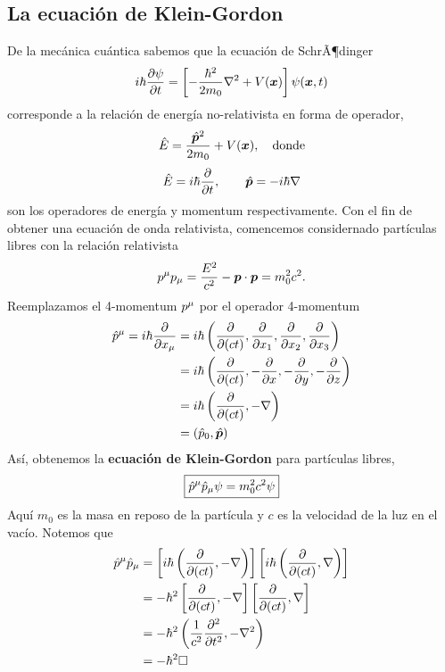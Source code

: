 \subsection{La ecuación de Klein-Gordon}
De la mecánica cuántica sabemos que la ecuación de SchrÃ¶dinger
\begin{equation}
  i\hbar \pdv{\psi}{t}=\left[-\frac{\hbar^2}{2m_0}\nabla^2+V(\vec{x})\right]\psi\xt 
\end{equation}
corresponde a la relación de energía no-relativista en forma de operador,
\begin{equation}
  \hat{E}=\frac{\hat{\vec{p}}^2}{2m_0}+V(\vec{x}),\quad \rm donde
\end{equation}
\begin{equation}
  \hat{E}=i\hbar\pdv{t},\qquad \hat{\vec{p}}=-i\hbar\nabla
\end{equation}
son los operadores de energía y momentum respectivamente. Con el fin de obtener una ecuación de onda relativista, comencemos considernado partículas libres con la relación relativista
\begin{equation}
  p^\m p_\m =\frac{E^2}{c^2}-\vec{p}\cdot\vec{p}=m_0^2c^2.
\end{equation}
Reemplazamos el 4-momentum $p^\m $ por el operador 4-momentum
\begin{align}
  \hat{p}^\m =i\hbar\pdv{x_\m }&=i\hbar\left(\pdv{(ct)},\pdv{x_1},\pdv{x_2},\pdv{x_3}\right)\\
  &=i\hbar\left(\pdv{(ct)},-\pdv{x},-\pdv{y},-\pdv{z}\right)\\
  &=i\hbar\left(\pdv{(ct)},-\nabla\right)\\
  &=(\hat{p}_0,\hat{\vec{p}})
\end{align}
Así, obtenemos la \textbf{ecuación de Klein-Gordon} para partículas libres,
\begin{equation}\label{1.21}
  \boxed{\hat{p}^\m \hat{p}_\m \psi=m_0^2c^2\psi}
\end{equation}
Aquí $m_0$ es la masa en reposo de la partícula y $c$ es la velocidad de la luz en el vacío. Notemos que
\begin{align}
  \hat{p}^\m \hat{p}_\m&=\left[i\hbar\left(\pdv{(ct)},-\nabla\right)\right]\left[i\hbar\left(\pdv{(ct)},\nabla\right)\right]\\
  &=-\hbar^2\left[\pdv{(ct)},-\nabla\right]\left[\pdv{(ct)},\nabla\right]\\
  &=-\hbar^2\left(\frac{1}{c^2}\pdv[2]{t},-\nabla^2\right)\\
  &=-\hbar^2\Box
\end{align}
